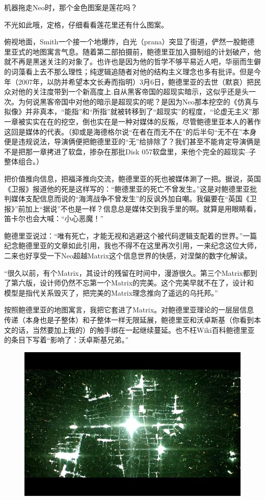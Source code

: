 \documentclass[UTF8]{ctexart}
\begin{document}
机器拖走Neo时，那个金色图案是莲花吗？

不光如此哦，定格，仔细看看莲花里还有什么图案。

俯视地面，Smith一个接一个地爆炸，白光（prana）突显了街道，俨然一股鲍德里亚式的地图寓言气息。随着第二部拍摄前，鲍德里亚加入摄制组的计划破产，他就不再是黑迷关注的对象了。也许也是因为他的哲学不够平易近人吧，华丽而生僻的词藻看上去不那么理性；纯逻辑追随者对他的结构主义理念也多有批评。但是今年（2007年，以防并希望本文长寿而指明）3月6日，鲍德里亚的去世（默哀）把民众对他的关注度带到一个新高度上.自从黑客帝国的超现实暗示，这似乎还是头一次。为何说黑客帝国中对他的暗示是超现实的呢？是因为Neo那本挖空的《仿真与拟像》并非真本，“能指”和“所指”就被转移到了“超现实”的程度，“论虚无主义”那一章被实实在在的挖空，倒也实在是一种对媒体的反叛，尽管鲍德里亚本人的著作这回是媒体的代表。（抑或是海德格尔说“在者在而无不在”的后半句“无不在”本身便是违规说法，导演俩便把鲍德里亚的“无”给排除了？我们甚至不能肯定导演俩是不是把那一章拷进了软盘，掺杂在那批Disk 057软盘里，来他个完全的超现实--子整体组合。）

把价值推向信息，把福泽推向交流，鲍德里亚的死也被媒体涮了一把。据说，英国《卫报》报道他的死是这样写的：“鲍德里亚的死亡不曾发生。”这是对鲍德里亚批判媒体支配信息而说的“海湾战争不曾发生”的反讽外加自嘲。我偏要在“英国《卫报》”前加上“据说”不也是一样？信息总是媒体交到我手里的啊。就算是用眼睛看，笛卡尔也会大喊：“小心恶魔！”

鲍德里亚说过：“唯有死亡，才能无视和逃避这个被代码逻辑支配着的世界。”一篇纪念鲍德里亚的文章如此引用，我也不得不在这里再次引用，一来纪念这位大师，二来也好享受一下Neo超越Matrix这个信息世界的快感，对涅槃的数字化解读。

“很久以前，有个Matrix，其设计的残留在时间中，漫游很久。第三个Matrix都到了第六版，设计师仍然不忘第一个Matrix的完美。这个完美早就不在了，设计和模型是指代关系毁灭了，把完美的Matrix理念推向了遥远的乌托邦。”

按照鲍德里亚的地图寓言，我把它套进了Matrix。对鲍德里亚理论的一层层信息传递（本身也是子整体）和子整体一样无限延展，鲍德里亚和沃卓斯基（你看到本文的话，当然要加上我的）的触手绑在一起继续蔓延。也不枉Wiki百科鲍德里亚的条目下写着“影响了：沃卓斯基兄弟。”

\begin{figure}[htb]
\centering
\includegraphics[width=0.5\linewidth]{fig/267beac458dbc1ad8326ac62.jpg}
\end{figure}
\end{document}
